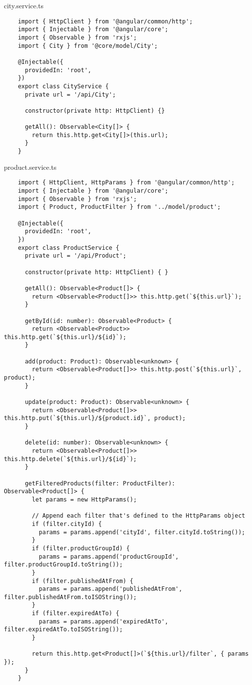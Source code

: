 city.service.ts
\begin{lstlisting}
    import { HttpClient } from '@angular/common/http';
    import { Injectable } from '@angular/core';
    import { Observable } from 'rxjs';
    import { City } from '@core/model/City';
    
    @Injectable({
      providedIn: 'root',
    })
    export class CityService {
      private url = '/api/City';
    
      constructor(private http: HttpClient) {}
    
      getAll(): Observable<City[]> {
        return this.http.get<City[]>(this.url);
      }
    }
\end{lstlisting}

product.service.ts
\begin{lstlisting}
    import { HttpClient, HttpParams } from '@angular/common/http';
    import { Injectable } from '@angular/core';
    import { Observable } from 'rxjs';
    import { Product, ProductFilter } from '../model/product';
    
    @Injectable({
      providedIn: 'root',
    })
    export class ProductService {
      private url = '/api/Product';
    
      constructor(private http: HttpClient) { }
    
      getAll(): Observable<Product[]> {
        return <Observable<Product[]>> this.http.get(`${this.url}`);
      }
    
      getById(id: number): Observable<Product> {
        return <Observable<Product>> this.http.get(`${this.url}/${id}`);
      }
    
      add(product: Product): Observable<unknown> {
        return <Observable<Product[]>> this.http.post(`${this.url}`, product);
      }
    
      update(product: Product): Observable<unknown> {
        return <Observable<Product[]>> this.http.put(`${this.url}/${product.id}`, product);
      }
    
      delete(id: number): Observable<unknown> {
        return <Observable<Product[]>> this.http.delete(`${this.url}/${id}`);
      }
    
      getFilteredProducts(filter: ProductFilter): Observable<Product[]> {
        let params = new HttpParams();
    
        // Append each filter that's defined to the HttpParams object
        if (filter.cityId) {
          params = params.append('cityId', filter.cityId.toString());
        }
        if (filter.productGroupId) {
          params = params.append('productGroupId', filter.productGroupId.toString());
        }
        if (filter.publishedAtFrom) {
          params = params.append('publishedAtFrom', filter.publishedAtFrom.toISOString());
        }
        if (filter.expiredAtTo) {
          params = params.append('expiredAtTo', filter.expiredAtTo.toISOString());
        }
    
        return this.http.get<Product[]>(`${this.url}/filter`, { params });
      }
    }
\end{lstlisting}


